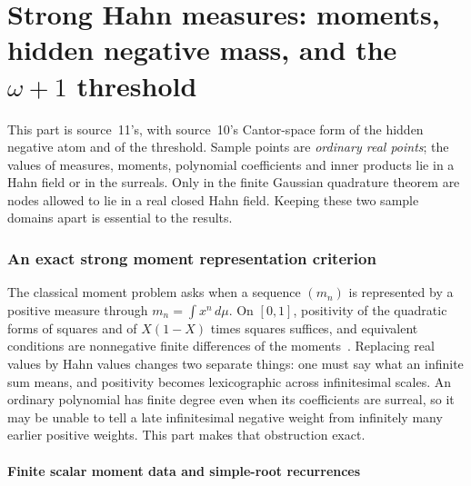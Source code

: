 \documentclass[11pt]{article}
\numberwithin{equation}{section}
\theoremstyle{definition}
\theoremstyle{remark}
\begin{document}
\part{Strong Hahn measures: moments, hidden negative mass, and the
\texorpdfstring{$\omega+1$}{omega+1} threshold}\label{meas:part:moments}

This part is source~11's, with source~10's Cantor-space form of the hidden
negative atom and of the threshold. Sample points are \emph{ordinary real
points}; the values of measures, moments, polynomial coefficients and inner
products lie in a Hahn field or in the surreals. Only in the finite Gaussian
quadrature theorem are nodes allowed to lie in a real closed Hahn field.
Keeping these two sample domains apart is essential to the results.

\section{An exact strong moment representation criterion}\label{meas:sec:moments}

The classical moment problem asks when a sequence $(m_n)$ is represented by a
positive measure through $m_n=\int x^n\,d\mu$. On $[0,1]$, positivity of the
quadratic forms of squares and of $X(1-X)$ times squares suffices, and
equivalent conditions are nonnegative finite differences of the
moments~\cite[Theorems 1.16 and 1.18]{Schmudgen}. Replacing real values by Hahn
values changes two
separate things: one must say what an infinite sum means, and positivity
becomes lexicographic across infinitesimal scales. An ordinary polynomial has
finite degree even when its coefficients are surreal, so it may be unable to
tell a late infinitesimal negative weight from infinitely many earlier positive
weights. This part makes that obstruction exact.

\subsection{Finite scalar moment data and simple-root recurrences}
\end{document}
